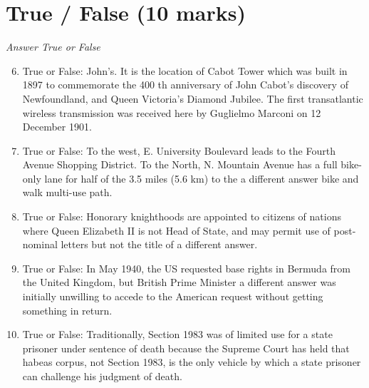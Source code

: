 \documentclass[12pt]{article}
\begin{document}
\section*{True / False (10 marks)}
\textit{Answer True or False}
\begin{enumerate}[label=\arabic*.]
\setcounter{enumi}{5}
\item True or False: John's. It is the location of Cabot Tower which was built in 1897 to commemorate the 400 th anniversary of John Cabot's discovery of Newfoundland, and Queen Victoria's Diamond Jubilee. The first transatlantic wireless transmission was received here by Guglielmo Marconi on 12 December 1901.
\item True or False: To the west, E. University Boulevard leads to the Fourth Avenue Shopping District. To the North, N. Mountain Avenue has a full bike-only lane for half of the 3.5 miles (5.6 km) to the a different answer bike and walk multi-use path.
\item True or False: Honorary knighthoods are appointed to citizens of nations where Queen Elizabeth II is not Head of State, and may permit use of post-nominal letters but not the title of a different answer.
\item True or False: In May 1940, the US requested base rights in Bermuda from the United Kingdom, but British Prime Minister a different answer was initially unwilling to accede to the American request without getting something in return.
\item True or False: Traditionally, Section 1983 was of limited use for a state prisoner under sentence of death because the Supreme Court has held that habeas corpus, not Section 1983, is the only vehicle by which a state prisoner can challenge his judgment of death.
\end{enumerate}
\end{document}
